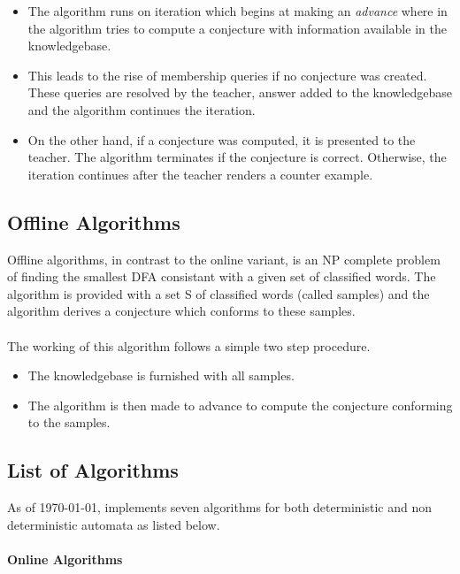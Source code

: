 \begin{itemize}
 \item The algorithm runs on iteration which begins at making an \emph{advance} where in the algorithm tries to compute a conjecture with information available in the knowledgebase.
 \item This leads to the rise of membership queries if no conjecture was created. These queries are resolved by the teacher, answer added to the knowledgebase and the algorithm continues the iteration.
 \item On the other hand, if a conjecture was computed, it is presented to the teacher. The algorithm terminates if the conjecture is correct. Otherwise, the iteration continues after the teacher renders a counter example.
\end{itemize}

\subsection*{Offline Algorithms}

Offline algorithms, in contrast to the online variant, is an NP complete problem of finding the smallest DFA consistant with a given set of classified words.
The algorithm is provided with a set S of classified words (called samples) and the algorithm derives a conjecture which conforms to these samples. 

\paragraph{}
The working of this algorithm follows a simple two step procedure. 
\begin{itemize}
 \item The knowledgebase is furnished with all samples. 
 \item The algorithm is then made to advance to compute the conjecture conforming to the samples. 
\end{itemize}

\subsection*{List of Algorithms}

As of \today, \libalf implements seven algorithms for both deterministic and non deterministic automata as listed below.

\paragraph{Online Algorithms}

